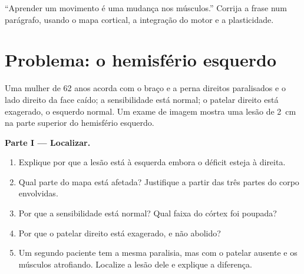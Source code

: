 \begin{exercise}[$\star\star\star$]\label{exo:g12:brain-and-movement:15}
``Aprender um movimento é uma mudança nos músculos.'' Corrija a frase
num parágrafo, usando o mapa cortical, a integração do  motor e
a plasticidade.
\end{exercise}

\section{Problema: o hemisfério esquerdo}

\begin{problem}
\label{pb:g12:brain-and-movement:1}
Uma mulher de 62 anos acorda com o braço e a perna direitos paralisados
e o lado direito da face caído; a sensibilidade está normal; o 
patelar direito está exagerado, o esquerdo normal. Um exame de imagem
mostra uma lesão de \qty{2}{cm} na parte superior do hemisfério esquerdo.

\medskip
\noindent\textbf{Parte I --- Localizar.}
\begin{enumerate}
  \item Explique por que a lesão está à esquerda embora o déficit
        esteja à direita.
  \item Qual parte do mapa está afetada? Justifique a partir das três
        partes do corpo envolvidas.
  \item Por que a sensibilidade está normal? Qual faixa do córtex foi
        poupada?
  \item Por que o  patelar direito está exagerado, e não abolido?
  \item Um segundo paciente tem a mesma paralisia, mas com o 
        patelar ausente e os músculos atrofiando. Localize a lesão dele
        e explique a diferença.
\end{enumerate}


\end{problem}
